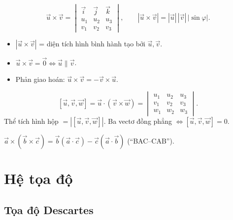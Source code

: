 \documentclass[12pt,a4paper]{article}
\begin{document}
\begin{congthuc}[title={Tích có hướng (vectơ)}]
  \[
    \vec{u} \times \vec{v} = \begin{vmatrix} \vec{i} & \vec{j} & \vec{k} \\ u_1 & u_2 & u_3 \\ v_1 & v_2 & v_3 \end{vmatrix}, \qquad |\vec{u} \times \vec{v}| = |\vec{u}|\,|\vec{v}|\,|\sin\varphi|.
  \]
  \begin{itemize}
    \item $|\vec{u} \times \vec{v}|$ = diện tích hình bình hành tạo bởi $\vec{u}, \vec{v}$.
    \item $\vec{u} \times \vec{v} = \vec{0} \Leftrightarrow \vec{u} \parallel \vec{v}$.
    \item Phản giao hoán: $\vec{u} \times \vec{v} = -\vec{v} \times \vec{u}$.
  \end{itemize}
\end{congthuc}

\begin{congthuc}[title={Tích hỗn tạp (vô hướng ba)}]
  \[
    [\vec{u}, \vec{v}, \vec{w}] = \vec{u} \cdot (\vec{v} \times \vec{w}) = \begin{vmatrix} u_1 & u_2 & u_3 \\ v_1 & v_2 & v_3 \\ w_1 & w_2 & w_3 \end{vmatrix}.
  \]
  Thể tích hình hộp $= |[\vec{u}, \vec{v}, \vec{w}]|$. Ba vectơ đồng phẳng $\Leftrightarrow [\vec{u}, \vec{v}, \vec{w}] = 0$.
\end{congthuc}

\begin{congthuc}[title={Tích kép (Lagrange)}]
  $\vec{a} \times (\vec{b} \times \vec{c}) = \vec{b}(\vec{a} \cdot \vec{c}) - \vec{c}(\vec{a} \cdot \vec{b})$ \quad (``BAC--CAB'').
\end{congthuc}

\section{Hệ tọa độ}

\subsection{Tọa độ Descartes}
\end{document}
